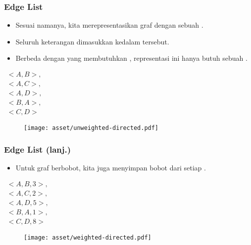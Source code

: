 \begin{frame}
\frametitle{Edge List}
\begin{itemize}
  \item Sesuai namanya, kita merepresentasikan graf dengan sebuah \flist.
  \item Seluruh keterangan \fedge dimasukkan kedalam \flist tersebut.
  \item Berbeda dengan \fadjacencylist yang membutuhkan , representasi ini hanya butuh sebuah \flist.
\end{itemize}
\begin{center}
\begin{multicols}{2}
  $\begin{array}{l}
    <A, B>, \\
    <A, C>, \\
    <A, D>, \\
    <B, A>, \\
    <C, D> 
  \end{array}$
  \break
  \begin{figure}
    \texttt{[image: asset/unweighted-directed.pdf]}
  \end{figure}
\end{multicols} 
\end{center}
\end{frame}

\begin{frame}
\frametitle{Edge List (lanj.)}
\begin{itemize}
  \item Untuk graf berbobot, kita juga menyimpan bobot dari setiap \fedge.
\end{itemize}
\begin{center}
\begin{multicols}{2}
  $\begin{array}{l}
    <A, B, 3>, \\
    <A, C, 2>, \\
    <A, D, 5>, \\
    <B, A, 1>, \\
    <C, D, 8> 
  \end{array}$
  \break
  \begin{figure}
    \texttt{[image: asset/weighted-directed.pdf]}
  \end{figure}
\end{multicols} 
\end{center}
\end{frame}


